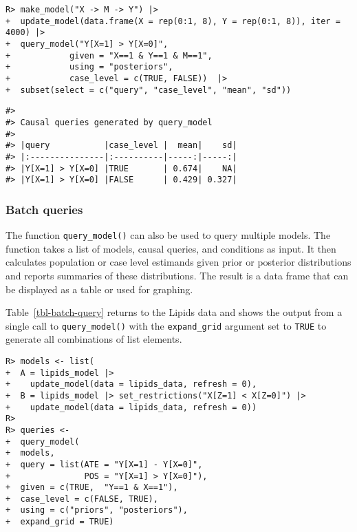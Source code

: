 \documentclass[
  11pt,
  article]{jss}
\begin{document}
\begin{verbatim}
R> make_model("X -> M -> Y") |>
+  update_model(data.frame(X = rep(0:1, 8), Y = rep(0:1, 8)), iter = 4000) |>
+  query_model("Y[X=1] > Y[X=0]", 
+            given = "X==1 & Y==1 & M==1", 
+            using = "posteriors",
+            case_level = c(TRUE, FALSE))  |> 
+  subset(select = c("query", "case_level", "mean", "sd"))
\end{verbatim}

\begin{verbatim}
#> 
#> Causal queries generated by query_model
#> 
#> |query           |case_level |  mean|    sd|
#> |:---------------|:----------|-----:|-----:|
#> |Y[X=1] > Y[X=0] |TRUE       | 0.674|    NA|
#> |Y[X=1] > Y[X=0] |FALSE      | 0.429| 0.327|
\end{verbatim}

\hypertarget{batch-queries}{%
\subsubsection{Batch queries}\label{batch-queries}}

The function \texttt{query\_model()} can also be used to query multiple
models. The function takes a list of models, causal queries, and
conditions as input. It then calculates population or case level
estimands given prior or posterior distributions and reports summaries
of these distributions. The result is a data frame that can be displayed
as a table or used for graphing.

Table~\ref{tbl-batch-query} returns to the Lipids data and shows the
output from a single call to \texttt{query\_model()} with the
\texttt{expand\_grid} argument set to \texttt{TRUE} to generate all
combinations of list elements.

\begin{verbatim}
R> models <- list(
+  A = lipids_model |> 
+    update_model(data = lipids_data, refresh = 0),
+  B = lipids_model |> set_restrictions("X[Z=1] < X[Z=0]") |>
+    update_model(data = lipids_data, refresh = 0))
R> 
R> queries <- 
+  query_model(
+  models,
+  query = list(ATE = "Y[X=1] - Y[X=0]", 
+               POS = "Y[X=1] > Y[X=0]"),
+  given = c(TRUE,  "Y==1 & X==1"),
+  case_level = c(FALSE, TRUE),
+  using = c("priors", "posteriors"),
+  expand_grid = TRUE)
\end{verbatim}
\end{document}
